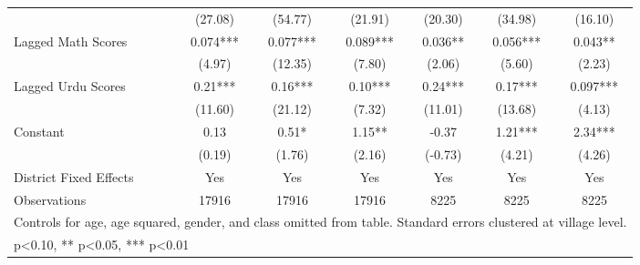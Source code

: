 \begin{sidewaystable}[htbp]
\begin{tabular}{l*{6}{c}}
                &  (27.08)   &  (54.77)   &  (21.91)   &  (20.30)   &  (34.98)   &  (16.10)   \\
Lagged Math Scores&    0.074***&    0.077***&    0.089***&    0.036** &    0.056***&    0.043** \\
                &   (4.97)   &  (12.35)   &   (7.80)   &   (2.06)   &   (5.60)   &   (2.23)   \\
Lagged Urdu Scores&     0.21***&     0.16***&     0.10***&     0.24***&     0.17***&    0.097***\\
                &  (11.60)   &  (21.12)   &   (7.32)   &  (11.01)   &  (13.68)   &   (4.13)   \\
Constant        &     0.13   &     0.51*  &     1.15** &    -0.37   &     1.21***&     2.34***\\
                &   (0.19)   &   (1.76)   &   (2.16)   &  (-0.73)   &   (4.21)   &   (4.26)   \\
District Fixed Effects&      Yes   &      Yes   &      Yes   &      Yes   &      Yes   &      Yes   \\
\midrule
Observations    &    17916   &    17916   &    17916   &     8225   &     8225   &     8225   \\
\bottomrule
\multicolumn{7}{l}{\footnotesize Controls for age, age squared, gender, and class omitted from table. Standard errors clustered at village level.}\\
\multicolumn{7}{l}{\footnotesize * p<0.10, ** p<0.05, *** p<0.01}\\
\end{tabular}
\end{sidewaystable}
